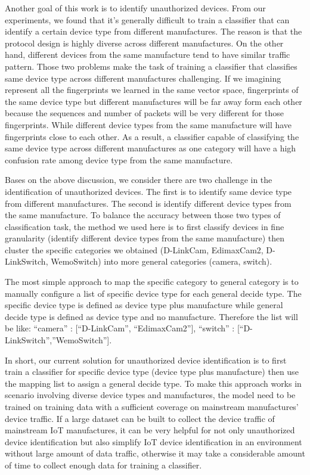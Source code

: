 \documentclass[twocolumn,10pt]{article}
\begin{document}
Another goal of this work is to identify unauthorized devices. From our experiments, we found that it’s generally difficult to train a classifier that can identify a certain device type from different manufactures. The reason is that the protocol design is highly diverse across different manufactures. On the other hand, different devices from the same manufacture tend to have similar traffic pattern. Those two problems make the task of  training a classifier that classifies same device type across different manufactures challenging. If we imagining represent all the fingerprints we learned in the same vector space, fingerprints of the same device type but different manufactures will be far away form each other because the sequences and number of packets will be very different for those fingerprints. While different device types from the same manufacture will have fingerprints close to each other. As a result,  a classifier capable of classifying the same device type across different manufactures as one category will have a high confusion rate among device type from the same manufacture. 

Bases on the above discussion, we consider there are two challenge in the identification of unauthorized devices. The first is to identify same device type from different manufactures. The second is identify different device types from the same manufacture. To balance the accuracy between those two types of classification task, the method we used here is to first classify devices in fine granularity (identify different device types from the same manufacture)  then cluster the specific categories we obtained (D-LinkCam, EdimaxCam2, D-LinkSwitch, WemoSwitch) into more general categories (camera, switch). 

The most simple approach to map the specific category to general category is to manually configure a list of specific device type for each general decide type. The specific device type is defined as device type plus manufacture while general decide type is defined as device type and no manufacture. Therefore the list will be like: “camera” : [“D-LinkCam”, “EdimaxCam2”], “switch” : [“D-LinkSwitch”,”WemoSwitch”]. 

In short, our current solution for unauthorized device identification is to first train a classifier for specific device type (device type plus manufacture) then use the mapping list to assign a general decide type. To make this approach works in scenario involving diverse device types and manufactures, the model need to be trained on training data with a sufficient coverage on mainstream manufactures’ device traffic. If a large dataset can be built to collect the device traffic of mainstream IoT manufactures, it can be very helpful for not only  unauthorized device identification but also simplify IoT device identification in an environment without large amount of data traffic, otherwise it may take a considerable amount of time to collect enough data for training a classifier.
\end{document}
